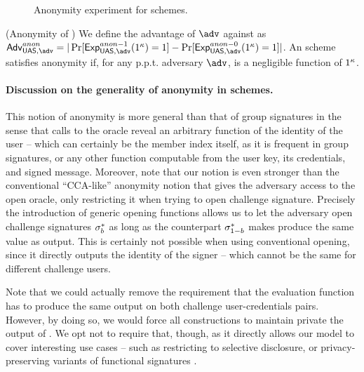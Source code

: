\begin{figure}[htp!]
  \caption{Anonymity experiment for \UAS schemes.}
  \label{fig:exp-uas-anonb}
\end{figure}

\begin{definition}{(Anonymity of \UAS)}
  \label{def:anonymity-uas}  
  We define the advantage \AdvAnon of $\adv$ against \ExpAnonb as
  $\AdvAnon=|\Pr\lbrack\ExpAnono(1^\secpar)=1\rbrack-
  \Pr\lbrack\ExpAnonz(1^\secpar)=1\rbrack|$.
  An \UAS scheme satisfies anonymity if, for any p.p.t. adversary $\adv$,
  \AdvAnon is a negligible function of $1^\kappa$.
\end{definition}

\paragraph{Discussion on the generality of anonymity in \UAS schemes.} %
This notion of anonymity is more general than that of group signatures in the
sense that calls to the \OPEN oracle reveal an arbitrary function of the
identity of the user -- which can certainly be the member index itself, as it
is frequent in group signatures, or any other function computable from the
user key, its credentials, and signed message. Moreover, note that
our notion is even stronger than the conventional ``CCA-like'' anonymity notion
that gives the adversary access to the open oracle, only restricting it when
trying to open challenge signature. Precisely the introduction of generic
opening functions allows us to let the adversary open challenge signatures
$\mathsf{\sigma}^*_b$ as long as the counterpart $\mathsf{\sigma}^*_{1-b}$
makes \Open produce the same \y value as output. This is certainly not
possible when using conventional opening, since it directly outputs the identity
of the signer -- which cannot be the same for different challenge users.

Note that we could actually remove the requirement that the evaluation function
has to produce the same output on both challenge user-credentials pairs.
However, by doing so, we would force all constructions to maintain private the
output of \feval. We opt not to require that, though, as it directly allows
our model to cover interesting use cases -- such as restricting to selective
disclosure, or privacy-preserving variants of functional signatures .

